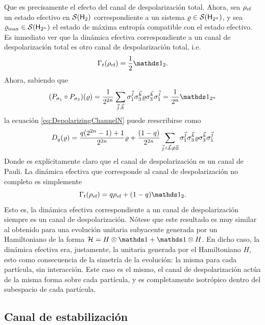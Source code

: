 Que es precisamente el efecto del canal de despolarización total. Ahora, sea $\rho_{\text{ef}}$ un estado efectivo en $\mathcal{S}({\sf H}_{2})$ correspondiente a un sistema $\varrho \in \mathcal{S}({\sf H}_{2^{n}})$, y sea $\varrho_{\max}\in\mathcal{S}({\sf H}_{2^{n}})$ el estado de máxima entropía compatible con el estado efectivo. Es inmediato ver que la dinámica efectiva correspondiente a un canal de despolarización total es otro canal de despolarización total, i.e.
\begin{equation}
    \Gamma_{t}(\rho_{\ef})=\frac{1}{2}\Id_{2}.
\end{equation}
Ahora, sabiendo que
\begin{equation}
    \qty(P_{\pauli{1}}\circ P_{\pauli{3}})(\varrho)=\frac{1}{2^{2n}}\sum_{\vec{j},\vec{k}}\pauli{1}^{\vec{j}}\pauli{3}^{\vec{k}}\varrho\pauli{3}^{\vec{k}}\pauli{1}^{\vec{j}}=\frac{1}{2^{n}}\Id_{2^{n}}\nonumber
\end{equation}
la ecuación \ref{eq:DepolarizingChannelN} puede reescribirse como
\begin{equation}
    D_{q}(\varrho)=\frac{q(2^{2n}-1)+1}{2^{2n}}\varrho+\frac{(1-q)}{2^{2n}}\sum_{\vec{j}\land\vec{k}\neq\vec{0}}\sigma_{1}^{\vec{j}}\sigma_{3}^{\vec{k}}\varrho\sigma_{3}^{\vec{k}}\sigma_{1}^{\vec{j}}\nonumber
\end{equation}
Donde es explícitamente claro que el canal de despolarización es un canal de Pauli. La dinámica efectiva que corresponde al canal de despolarización no completo es simplemente
\begin{equation}
    \Gamma_{t}(\rho_{\ef})=q\rho_{\ef}+(1-q)\Id_{2}.\nonumber
\end{equation}
Esto es, la dinámica efectiva correspondiente a un canal de despolarización siempre es un canal de despolarización. Nótese que este resultado es muy similar al obtenido para una evolución unitaria subyacente generada por un Hamiltoniano de la forma $\mcH=H\otimes\Id+\Id\otimes H$. En dicho caso, la dinámica efectiva era, justamente, la unitaria generada por el Hamiltoniano $H$, esto como consecuencia de la simetría de la evolución: la misma para cada partícula, sin interacción. Este caso es el mismo, el canal de despolarización actúa de la misma forma sobre cada partícula, y es completamente isotrópico dentro del subespacio de cada partícula.

\subsection{Canal de estabilización}

